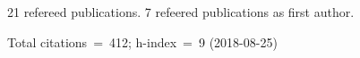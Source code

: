 21 refereed publications. 7 refeered publications as first author.

               Total citations~=~412; h-index~=~9 (2018-08-25)